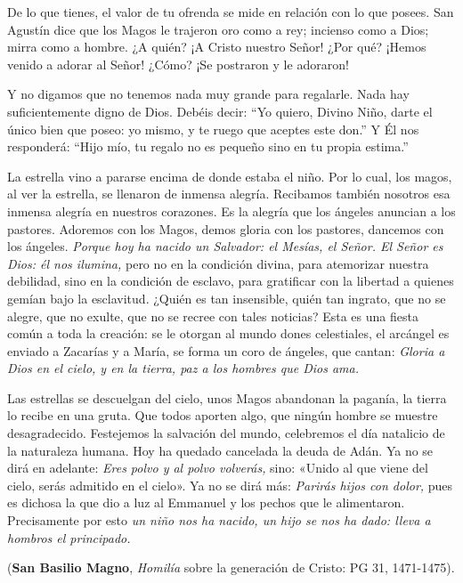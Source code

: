 \documentclass[]{article}
\begin{document}
De lo que tienes, el valor de tu ofrenda se mide en relación con lo que
posees. San Agustín dice que los Magos le trajeron oro como a rey;
incienso como a Dios; mirra como a hombre. ¿A quién? ¡A Cristo nuestro
Señor! ¿Por qué? ¡Hemos venido a adorar al Señor! ¿Cómo? ¡Se postraron y
le adoraron!

Y no digamos que no tenemos nada muy grande para regalarle. Nada hay
suficientemente digno de Dios. Debéis decir: ``Yo quiero, Divino Niño,
darte el único bien que poseo: yo mismo, y te ruego que aceptes este
don.'' Y Él nos responderá: ``Hijo mío, tu regalo no es pequeño sino en
tu propia estima.''

\protect\hypertarget{_Toc448662864}{}{\protect\hypertarget{_Toc448690383}{}{}}

La estrella vino a pararse encima de donde estaba el niño. Por lo cual,
los magos, al ver la estrella, se llenaron de inmensa alegría. Recibamos
también nosotros esa inmensa alegría en nuestros corazones. Es la
alegría que los ángeles anuncian a los pastores. Adoremos con los Magos,
demos gloria con los pastores, dancemos con los ángeles. \emph{Porque
hoy ha nacido un Salvador: el Mesías, el Señor. El Señor es Dios: él nos
ilumina,} pero no en la condición divina, para atemorizar nuestra
debilidad, sino en la condición de esclavo, para gratificar con la
libertad a quienes gemían bajo la esclavitud. ¿Quién es tan insensible,
quién tan ingrato, que no se alegre, que no exulte, que no se recree con
tales noticias? Esta es una fiesta común a toda la creación: se le
otorgan al mundo dones celestiales, el arcángel es enviado a Zacarías y
a María, se forma un coro de ángeles, que cantan: \emph{Gloria a Dios en
el cielo, y en la tierra, paz a los hombres que Dios ama.}

Las estrellas se descuelgan del cielo, unos Magos abandonan la paganía,
la tierra lo recibe en una gruta. Que todos aporten algo, que ningún
hombre se muestre desagradecido. Festejemos la salvación del mundo,
celebremos el día natalicio de la naturaleza humana. Hoy ha quedado
cancelada la deuda de Adán. Ya no se dirá en adelante: \emph{Eres polvo
y al polvo volverás,} sino: «Unido al que viene del cielo, serás
admitido en el cielo». Ya no se dirá más: \emph{Parirás hijos con
dolor,} pues es dichosa la que dio a luz al Emmanuel y los pechos que le
alimentaron. Precisamente por esto \emph{un niño nos ha nacido, un hijo
se nos ha dado: lleva a hombros el principado.}

\protect\hypertarget{San_Basilio_Magno}{}{}(\textbf{San Basilio Magno},
\emph{Homilía} sobre la generación de Cristo: PG 31, 1471-1475).
\end{document}
